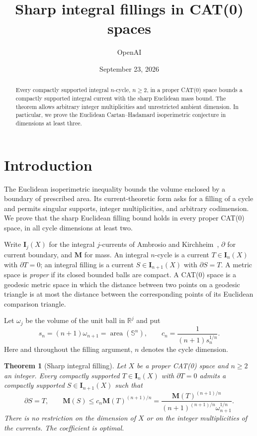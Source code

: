 \documentclass[11pt]{article}
\title{Sharp integral fillings in CAT(0) spaces}
\author{OpenAI}
\date{September 23, 2026}
\numberwithin{equation}{section}
\newtheorem{theorem}{Theorem}[section]
\theoremstyle{definition}
\theoremstyle{remark}
\newcommand{\R}{\mathbb R}
\newcommand{\I}{\mathbf I}
\newcommand{\M}{\mathbf M}
\begin{document}
\maketitle
\begin{abstract}
Every compactly supported integral $n$-cycle, $n\ge2$, in a proper
CAT(0) space bounds a compactly supported integral current with the
sharp Euclidean mass bound. The theorem allows arbitrary integer
multiplicities and unrestricted ambient dimension. In particular, we prove
the Euclidean Cartan--Hadamard isoperimetric conjecture in dimensions
at least three.
\end{abstract}
\section{Introduction}\label{sec:introduction}

The Euclidean isoperimetric inequality bounds the volume enclosed by a
boundary of prescribed area. Its current-theoretic form asks for a filling
of a cycle and permits singular supports, integer multiplicities, and
arbitrary codimension. We prove that the sharp Euclidean filling bound
holds in every proper CAT(0) space, in all cycle dimensions at least two.

Write $\I_j(X)$ for the integral $j$-currents of Ambrosio and
Kirchheim~\cite{AK2000}, $\partial$ for current boundary, and $\M$
for mass. An integral $n$-cycle is a current $T\in\I_n(X)$ with
$\partial T=0$; an integral filling is a current $S\in\I_{n+1}(X)$
with $\partial S=T$. A metric space is \emph{proper} if its closed
bounded balls are compact. A CAT(0) space is a geodesic metric space in which the distance
between two points on a geodesic triangle is at most the distance between
the corresponding points of its Euclidean comparison triangle.

Let $\omega_j$ be the volume of the unit ball in $\R^j$ and put
\begin{equation}\label{eq:constants}
 s_n=(n+1)\omega_{n+1}=\operatorname{area}(\mathbb S^n),
 \qquad c_n=\frac{1}{(n+1)s_n^{1/n}}.
\end{equation}
Here and throughout the filling argument, $n$ denotes the cycle
dimension.

\begin{theorem}[Sharp integral filling]\label{thm:main}
Let $X$ be a proper CAT(0) space and $n\ge2$ an integer.
Every compactly supported $T\in\I_n(X)$ with $\partial T=0$ admits a
compactly supported $S\in\I_{n+1}(X)$ such that
\begin{equation}\label{eq:main}
 \partial S=T,\qquad
 \M(S)\le c_n\M(T)^{(n+1)/n}
 =\frac{\M(T)^{(n+1)/n}}
 {(n+1)^{(n+1)/n}\omega_{n+1}^{1/n}}.
\end{equation}
There is no restriction on the dimension of $X$ or on the integer
multiplicities of the currents. The coefficient is optimal.
\end{theorem}
\end{document}
